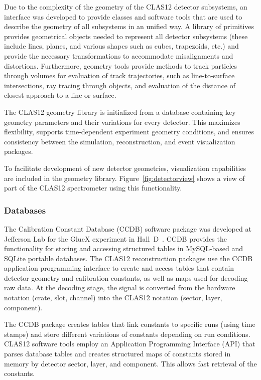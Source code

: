 Due to the complexity of the geometry of the CLAS12 detector subsystems, an interface was developed to provide
classes and software tools that are used to describe the geometry of all subsystems in an unified way.  A library of
primitives provides geometrical objects needed to represent all detector subsystems (these include lines, planes,
and various shapes such as cubes, trapezoids, etc.) and provide the necessary transformations to accommodate
misalignments and distortions.  Furthermore, geometry tools provide methods to track particles through volumes for
evaluation of track trajectories, such as line-to-surface intersections, ray tracing through objects, and evaluation of
the distance of closest approach to a line or surface.

The CLAS12 geometry library is initialized from a database containing key geometry parameters and their
variations for every detector.  This maximizes flexibility, supports time-dependent experiment geometry
conditions, and ensures consistency between the simulation, reconstruction, and event visualization packages.

To facilitate development of new detector geometries, visualization capabilities are included in the geometry library.
Figure~\ref{fig:detectorview} shows a view of part of the CLAS12 spectrometer using this functionality.

\subsubsection{Databases}

The Calibration Constant Database (CCDB) software package was developed at Jefferson Lab for the GlueX
experiment in Hall~D~\cite{gluex}.  CCDB provides the functionality for storing and accessing structured tables in
MySQL-based and SQLite portable databases. The CLAS12 reconstruction packages use the CCDB application
programming interface to create and access tables that contain detector geometry and calibration constants, as
well as maps used for decoding raw data. At the decoding stage, the signal is converted from the hardware notation
(crate, slot, channel) into the CLAS12 notation (sector, layer, component). 

The CCDB package creates tables that link constants to specific runs (using time stamps) and store different
variations of constants depending on run conditions. CLAS12 software tools employ an Application Programming
Interface (API) that parses database tables and creates structured maps of constants stored in  memory by
detector sector, layer, and component. This allows fast retrieval of the constants.

